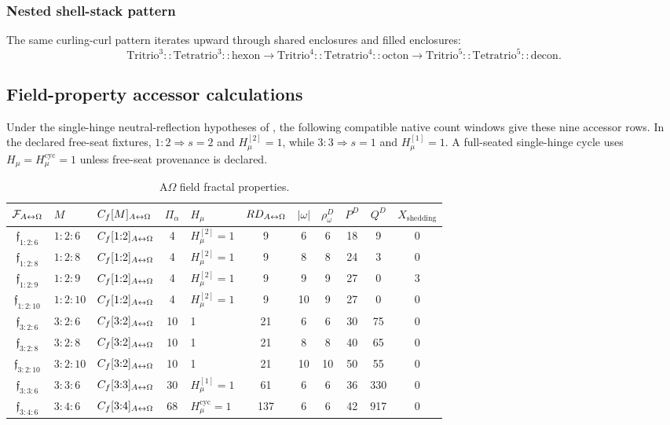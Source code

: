 \subsubsection{Nested shell-stack pattern}\label{subsec:nested-shell-stack-pattern}
The same curling-curl pattern iterates upward through shared enclosures and filled enclosures:
\[
\mathrm{Tritrio}^{3}::\mathrm{Tetratrio}^{3}::\mathrm{hexon}
\to
\mathrm{Tritrio}^{4}::\mathrm{Tetratrio}^{4}::\mathrm{octon}
\to
\mathrm{Tritrio}^{5}::\mathrm{Tetratrio}^{5}::\mathrm{decon}.
\]

\subsection{Field-property accessor calculations}\label{app:ao-field-fractal-properties:accessors-table}
Under the single-hinge neutral-reflection hypotheses of
, the following
compatible native count windows give these nine accessor rows.
In the declared free-seat fixtures, \(1{:}2\Rightarrow s=2\) and
\(H_\mu^{[2]}=1\), while \(3{:}3\Rightarrow s=1\) and
\(H_\mu^{[1]}=1\). A full-seated single-hinge cycle uses
\(H_\mu=H_\mu^{\mathrm{cyc}}=1\) unless free-seat provenance is declared.
\begin{table}[H]
\centering
\scriptsize
\caption{A\(\Omega\) field fractal properties.}
\begin{tabular}{c l l c l c c c c c c}
\toprule
\(\mathcal F_{A{\leftrightarrow}\Omega}\) & \(M\) & \(C_f[M]_{A{\leftrightarrow}\Omega}\) & \(\Pi_\alpha\) & \(H_\mu\) & \(RD_{A{\leftrightarrow}\Omega}\) & \(|\omega|\) & \(\rho^D_\omega\) & \(P^D\) & \(Q^D\) & \(X_{\mathrm{shedding}}\) \\
\midrule
\(\mathfrak f_{1:2:6}\) & \(1{:}2{:}6\) & \(C_f[1{:}2]_{A{\leftrightarrow}\Omega}\) & 4 & \(H_\mu^{[2]}=1\) & 9 & 6 & 6 & 18 & 9 & 0 \\
\(\mathfrak f_{1:2:8}\) & \(1{:}2{:}8\) & \(C_f[1{:}2]_{A{\leftrightarrow}\Omega}\) & 4 & \(H_\mu^{[2]}=1\) & 9 & 8 & 8 & 24 & 3 & 0 \\
\(\mathfrak f_{1:2:9}\) & \(1{:}2{:}9\) & \(C_f[1{:}2]_{A{\leftrightarrow}\Omega}\) & 4 & \(H_\mu^{[2]}=1\) & 9 & 9 & 9 & 27 & 0 & 3 \\
\(\mathfrak f_{1:2:10}\) & \(1{:}2{:}10\) & \(C_f[1{:}2]_{A{\leftrightarrow}\Omega}\) & 4 & \(H_\mu^{[2]}=1\) & 9 & 10 & 9 & 27 & 0 & 0 \\
\(\mathfrak f_{3:2:6}\) & \(3{:}2{:}6\) & \(C_f[3{:}2]_{A{\leftrightarrow}\Omega}\) & 10 & 1 & 21 & 6 & 6 & 30 & 75 & 0 \\
\(\mathfrak f_{3:2:8}\) & \(3{:}2{:}8\) & \(C_f[3{:}2]_{A{\leftrightarrow}\Omega}\) & 10 & 1 & 21 & 8 & 8 & 40 & 65 & 0 \\
\(\mathfrak f_{3:2:10}\) & \(3{:}2{:}10\) & \(C_f[3{:}2]_{A{\leftrightarrow}\Omega}\) & 10 & 1 & 21 & 10 & 10 & 50 & 55 & 0 \\
\(\mathfrak f_{3:3:6}\) & \(3{:}3{:}6\) & \(C_f[3{:}3]_{A{\leftrightarrow}\Omega}\) & 30 & \(H_\mu^{[1]}=1\) & 61 & 6 & 6 & 36 & 330 & 0 \\
\(\mathfrak f_{3:4:6}\) & \(3{:}4{:}6\) & \(C_f[3{:}4]_{A{\leftrightarrow}\Omega}\) & 68 & \(H_\mu^{\mathrm{cyc}}=1\) & 137 & 6 & 6 & 42 & 917 & 0 \\
\bottomrule
\end{tabular}
\label{tab:ao-field-fractal-properties}
\end{table}

